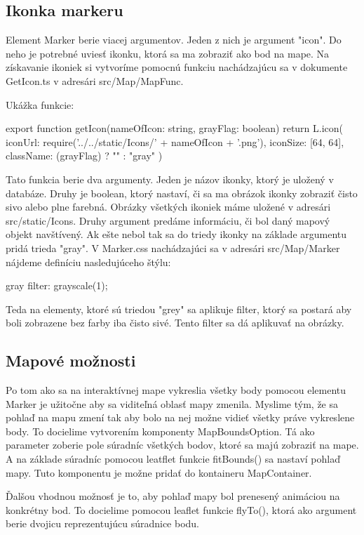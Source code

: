 \subsection*{Ikonka markeru }
Element Marker berie viacej argumentov. Jeden z nich je argument "icon". Do neho je potrebné uviesť ikonku, ktorá sa ma zobraziť ako bod na mape. 
Na získavanie ikoniek si vytvoríme pomocnú funkciu nachádzajúcu sa v dokumente GetIcon.ts v adresári src/Map/MapFunc. 

Ukážka funkcie:
\begin{code}
export function getIcon(nameOfIcon: string, grayFlag: boolean) {
    return L.icon({
        iconUrl: require('../../static/Icons/' + nameOfIcon + '.png'),
        iconSize: [64, 64],
        className: (grayFlag) ? "" : "gray"
    })
}
\end{code}

Tato funkcia berie dva argumenty. Jeden je názov ikonky, ktorý je uložený v databáze. Druhy je boolean, ktorý nastaví, či sa ma obrázok ikonky zobraziť čisto sivo alebo plne farebná.  
Obrázky všetkých ikoniek máme uložené v adresári src/static/Icons. Druhy argument predáme informáciu, či bol daný mapový objekt navštívený. Ak ešte nebol tak sa do triedy ikonky na základe argumentu pridá trieda "gray". 
V Marker.css nachádzajúci sa v adresári src/Map/Marker nájdeme definíciu nasledujúceho štýlu: 
\begin{code}
gray {
    filter: grayscale(1);
}
\end{code}
Teda na elementy, ktoré sú triedou "grey" sa aplikuje filter, ktorý sa postará aby boli zobrazene bez farby iba čisto sivé. Tento filter sa dá aplikuvať na obrázky. 

\subsection*{Mapové možnosti}
Po tom ako sa na interaktívnej mape vykreslia všetky body pomocou elementu Marker je užitočne aby sa viditeľná oblasť mapy zmenila. Myslime tým, že sa pohlaď na mapu zmení tak aby bolo 
na nej možne vidieť všetky práve vykreslene body. To docielime vytvorením komponenty MapBoundsOption. Tá ako parameter zoberie pole súradníc všetkých bodov, ktoré sa majú zobraziť na mape. 
A na základe súradníc pomocou leatflet funkcie fitBounds() sa nastaví pohlaď mapy. 
Tuto komponentu je možne pridať do kontaineru MapContainer. 

Ďalšou vhodnou možnosť je to, aby pohlaď mapy bol prenesený animáciou na konkrétny bod. To docielime pomocou leaflet funkcie flyTo(), ktorá ako argument berie dvojicu reprezentujúcu súradnice bodu. 

